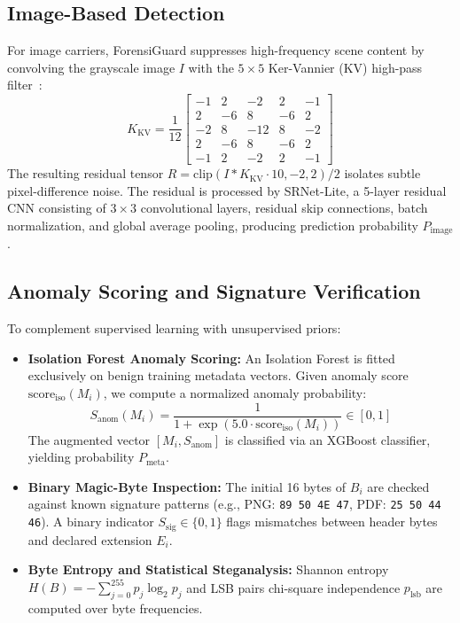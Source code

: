 \documentclass[conference]{IEEEtran}
\begin{document}
\subsection{Image-Based Detection}
For image carriers, ForensiGuard suppresses high-frequency scene content by convolving the grayscale image $I$ with the $5 \times 5$ Ker-Vannier (KV) high-pass filter~\cite{fridrich2012rich}:
\begin{equation}
    K_{\text{KV}} = \frac{1}{12} \begin{bmatrix}
    -1 & 2 & -2 & 2 & -1 \\
    2 & -6 & 8 & -6 & 2 \\
    -2 & 8 & -12 & 8 & -2 \\
    2 & -6 & 8 & -6 & 2 \\
    -1 & 2 & -2 & 2 & -1
    \end{bmatrix}
\end{equation}
The resulting residual tensor $R = \text{clip}(I * K_{\text{KV}} \cdot 10, -2, 2) / 2$ isolates subtle pixel-difference noise. The residual is processed by SRNet-Lite, a 5-layer residual CNN consisting of $3 \times 3$ convolutional layers, residual skip connections, batch normalization, and global average pooling, producing prediction probability $P_{\text{image}}$.

\subsection{Anomaly Scoring and Signature Verification}
To complement supervised learning with unsupervised priors:
\begin{itemize}
    \item \textbf{Isolation Forest Anomaly Scoring:} An Isolation Forest is fitted exclusively on benign training metadata vectors. Given anomaly score $\text{score}_{\text{iso}}(M_i)$, we compute a normalized anomaly probability:
    \begin{equation}
        S_{\text{anom}}(M_i) = \frac{1}{1 + \exp(5.0 \cdot \text{score}_{\text{iso}}(M_i))} \in [0, 1]
    \end{equation}
    The augmented vector $[M_i, S_{\text{anom}}]$ is classified via an XGBoost classifier, yielding probability $P_{\text{meta}}$.
    \item \textbf{Binary Magic-Byte Inspection:} The initial 16 bytes of $B_i$ are checked against known signature patterns (e.g., PNG: \texttt{89 50 4E 47}, PDF: \texttt{25 50 44 46}). A binary indicator $S_{\text{sig}} \in \{0, 1\}$ flags mismatches between header bytes and declared extension $E_i$.
    \item \textbf{Byte Entropy and Statistical Steganalysis:} Shannon entropy $H(B) = -\sum_{j=0}^{255} p_j \log_2 p_j$ and LSB pairs chi-square independence $p_{\text{lsb}}$ are computed over byte frequencies.
\end{itemize}
\end{document}
